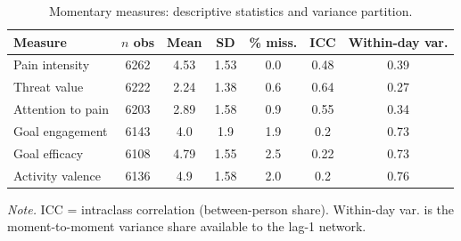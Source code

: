 \begin{table}[!htbp]
\raggedright
\caption{Momentary measures: descriptive statistics and variance partition.}
\label{tab:emadesc}
\footnotesize
\begingroup
\setlength{\tabcolsep}{4pt}
\renewcommand{\arraystretch}{1.08}
\noindent
\begin{tabular*}{\textwidth}{@{\extracolsep{\fill}}lcccccc@{}}
\toprule
Measure & $n$ obs & Mean & SD & \% miss. & ICC & Within-day var. \\
\midrule
Pain intensity & 6262 & 4.53 & 1.53 & 0.0 & 0.48 & 0.39 \\
Threat value & 6222 & 2.24 & 1.38 & 0.6 & 0.64 & 0.27 \\
Attention to pain & 6203 & 2.89 & 1.58 & 0.9 & 0.55 & 0.34 \\
Goal engagement & 6143 & 4.0 & 1.9 & 1.9 & 0.2 & 0.73 \\
Goal efficacy & 6108 & 4.79 & 1.55 & 2.5 & 0.22 & 0.73 \\
Activity valence & 6136 & 4.9 & 1.58 & 2.0 & 0.2 & 0.76 \\
\bottomrule
\end{tabular*}
\par\vspace{3pt}\noindent\parbox{\textwidth}{\footnotesize\textit{Note.} ICC = intraclass correlation (between-person share). Within-day var. is the moment-to-moment variance share available to the lag-1 network.}
\endgroup
\end{table}

